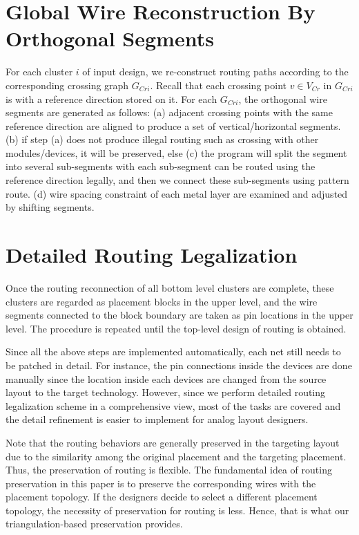     

  \section{Global Wire Reconstruction By Orthogonal Segments}\label{sec:GWRecon}
    For each cluster $i$ of input design, we re-construct routing paths according to the corresponding crossing graph $G_{Cri}$.
    Recall that each crossing point $v \in V_{Cr}$ in $G_{Cri}$ is with a reference direction stored on it.
    For each $G_{Cri}$, the orthogonal wire segments are generated as follows:
    (a) adjacent crossing points with the same reference direction are aligned to produce a set of vertical/horizontal segments.
    (b) if step (a) does not produce illegal routing such as crossing with other modules/devices, it will be preserved, else
    (c) the program will split the segment into several sub-segments with each sub-segment can be routed using the reference direction legally, and then we connect these sub-segments using pattern route.
    (d) wire spacing constraint of each metal layer are examined and adjusted by shifting segments.


  \section{Detailed Routing Legalization}\label{sec:DRLegal}
    Once the routing reconnection of all bottom level clusters are complete, 
    these clusters are regarded as placement blocks in the upper level,
    and the wire segments connected to the block boundary are taken as pin locations in the upper level.
    The procedure is repeated until the top-level design of routing is obtained.

  Since all the above steps are implemented automatically, each net still needs to be patched in detail. For instance, the pin connections inside the devices are done manually since the location inside each devices are changed from the source layout to the target technology. 
  However, since we perform detailed routing legalization scheme in a comprehensive view, most of the tasks are covered and the detail refinement is easier to implement for analog layout designers.
  
  Note that the routing behaviors are generally preserved in the targeting layout due to the similarity among the original placement and the targeting placement. Thus, the preservation of routing is flexible. The fundamental idea of routing preservation in this paper is to preserve the corresponding wires with the placement topology. If the designers decide to select a different placement topology, the necessity of preservation for routing is less. Hence, that is what our triangulation-based preservation provides.


